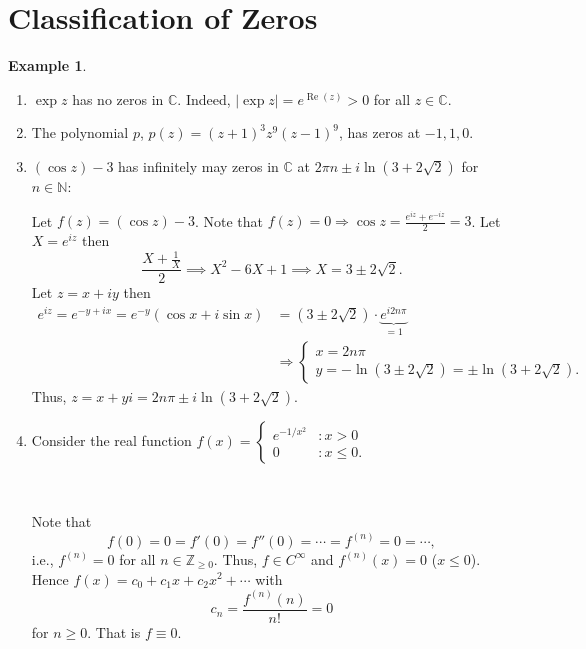 \documentclass[12pt,openany]{book}
\theoremstyle{definition}
\newtheorem{example}{Example}[section]
\newcommand{\N}{\mathbb{N}}
\newcommand{\Z}{\mathbb{Z}}
\newcommand{\C}{\mathbb{C}}
\newcommand{\of}[1]{\left( #1 \right)}
\newcommand{\abs}[1]{\left\lvert #1 \right\rvert}
\renewcommand{\Re}{\operatorname{Re}}
\newcommand{\ie}{\textnormal{i.e.}}
\begin{document}
	\section{Classification of Zeros}
	\begin{example}
		\ \begin{enumerate}[(1)]
			\item $\exp z$ has no zeros in $\C$. Indeed, $\abs{\exp z}=e^{\Re(z)}>0$ for all $z\in\C$.
			\item The polynomial $p$, $p(z)=(z+1)^3z^9(z-1)^9$, has zeros at $-1, 1, 0$.
			\item $(\cos z)-3$ has infinitely may zeros in $\C$ at $2\pi n\pm i\ln(3+2\sqrt{2})$ for $n\in\N$:
			
			Let $f(z)=\of{\cos z}-3$. Note that $f(z)=0\Rightarrow\cos z=\frac{e^{iz}+e^{-iz}}{2}=3$. Let $X=e^{iz}$ then \[
			\frac{X+\frac{1}{X}}{2}\implies X^2-6X+1\implies X=3\pm 2\sqrt{2}.
			\] Let $z=x+iy$ then \begin{align*}
				e^{iz}=e^{-y+ix}=e^{-y}\of{\cos x+i\sin x}
				&=(3\pm2\sqrt{2})\cdot \underbrace{e^{i2n\pi}}_{=1}\\
				&\Rightarrow\begin{cases}
					x = 2n\pi\\
					y = -\ln(3\pm 2\sqrt{2})=\pm\ln(3+ 2\sqrt{2}).
				\end{cases}
			\end{align*} Thus, $z=x+yi=2n\pi\pm i\ln(3+2\sqrt{2})$.
			\item 
			Consider the real function $f(x)=\begin{cases}
				e^{-1/x^2} &:x>0\\
				0 &:x\leq 0.
			\end{cases}$
			\begin{center}
				\\
			\end{center} Note that \[
			f(0)=0=f'(0)=f''(0)=\cdots=f^{(n)}=0=\cdots,
			\] \ie, $f^{(n)}=0$ for all $n\in\Z_{\geq 0}$. Thus, $f\in C^\infty$ and $f^{(n)}(x)=0$ ($x\leq 0$). Hence $f(x)=c_0+c_1x+c_2x^2+\cdots$ with \[
			c_n=\frac{f^{(n)}(n)}{n!}=0
			\] for $n\geq 0$. That is $f\equiv 0$.
		\end{enumerate}
	\end{example}
\end{document}
